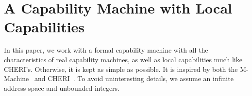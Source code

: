\documentclass[format=acmsmall, review=false, screen=true]{acmart}
\begin{document}





\section{A Capability Machine with Local Capabilities}
\label{sec:capab-mach-with}
In this paper, we work with a formal capability machine with all the
characteristics of real capability machines, as well as local capabilities much
like CHERI's. Otherwise, it is kept as simple as possible. It is inspired by
both the M-Machine~\citep{Carter:1994:HSF:195473.195579} and
CHERI~\citep{Watson2015Cheri}. To avoid uninteresting details, we assume an
infinite address space and unbounded integers.
\end{document}

